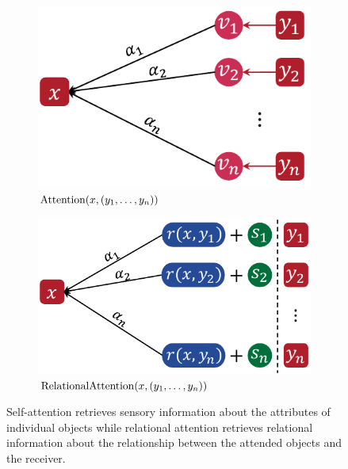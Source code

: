 \begin{figure}[t]
  \centering
  \begin{subfigure}[t]{0.415384615\textwidth} %
    \centering
    \includegraphics[width=\textwidth]{figs/sensory_retrieval.pdf} %
    \caption{$\mathrm{Attention}(x, (y_1, \ldots, y_n))$}%
  \end{subfigure}
  \qquad
  \begin{subfigure}[t]{0.484615385\textwidth} %
    \centering
    \includegraphics[width=\textwidth]{figs/relational_retrieval.pdf} %
    \caption{$\mathrm{RelationalAttention}(x, (y_1, \ldots, y_n))$}%
  \end{subfigure}
  \caption{Self-attention retrieves sensory information about the attributes of individual objects while relational attention retrieves relational information about the relationship between the attended objects and the receiver.}\label{fig:selfattn_relattn}
\end{figure}

